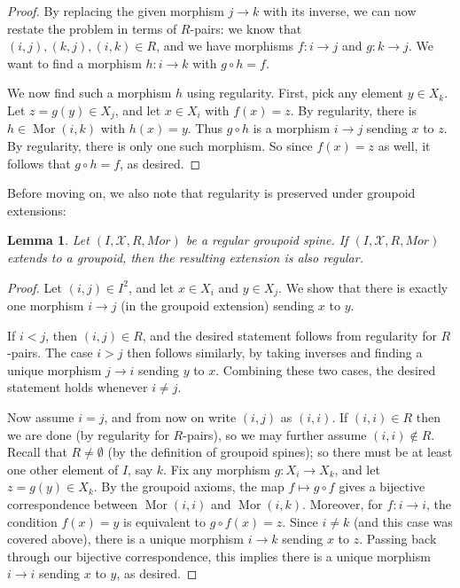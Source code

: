 \documentclass{amsart}
\newtheorem{lemma}[theorem]{Lemma}
\theoremstyle{definition}
\begin{document}
\begin{proof}
    By replacing the given morphism $j\rightarrow k$ with its inverse, we can now restate the problem in terms of $R$-pairs: we know that $(i,j),(k,j),(i,k)\in R$, and we have morphisms $f:i\rightarrow j$ and $g:k\rightarrow j$. We want to find a morphism $h:i\rightarrow k$ with $g\circ h=f$.

    We now find such a morphism $h$ using regularity. First, pick any element $y\in X_k$. Let $z=g(y)\in X_j$, and let $x\in X_i$ with $f(x)=z$. By regularity, there is $h\in\operatorname{Mor}(i,k)$ with $h(x)=y$. Thus $g\circ h$ is a morphism $i\rightarrow j$ sending $x$ to $z$. By regularity, there is only one such morphism. So since $f(x)=z$ as well, it follows that $g\circ h=f$, as desired.
\end{proof}

Before moving on, we also note that regularity is preserved under groupoid extensions:

\begin{lemma}\label{L: regularity of extension}
    Let $(I,\mathcal X,R,Mor)$ be a regular groupoid spine. If $(I,\mathcal X,R,Mor)$ extends to a groupoid, then the resulting extension is also regular.
\end{lemma}
\begin{proof}
    Let $(i,j)\in I^2$, and let $x\in X_i$ and $y\in X_j$. We show that there is exactly one morphism $i\rightarrow j$ (in the groupoid extension) sending $x$ to $y$.

    If $i<j$, then $(i,j)\in R$, and the desired statement follows from regularity for $R$-pairs. The case $i>j$ then follows similarly, by taking inverses and finding a unique morphism $j\rightarrow i$ sending $y$ to $x$. Combining these two cases, the desired statement holds whenever $i\neq j$.

    Now assume $i=j$, and from now on write $(i,j)$ as $(i,i)$. If $(i,i)\in R$ then we are done (by regularity for $R$-pairs), so we may further assume $(i,i)\notin R$. Recall that $R\neq\emptyset$ (by the definition of groupoid spines); so there must be at least one other element of $I$, say $k$. Fix any morphism $g:X_i\rightarrow X_k$, and let $z=g(y)\in X_k$. By the groupoid axioms, the map $f\mapsto g\circ f$ gives a bijective correspondence between $\operatorname{Mor}(i,i)$ and $\operatorname{Mor}(i,k)$. Moreover, for $f:i\rightarrow i$, the condition $f(x)=y$ is equivalent to $g\circ f(x)=z$. Since $i\neq k$ (and this case was covered above), there is a unique morphism $i\rightarrow k$ sending $x$ to $z$. Passing back through our bijective correspondence, this implies there is a unique morphism $i\rightarrow i$ sending $x$ to $y$, as desired.
\end{proof}
\end{document}
